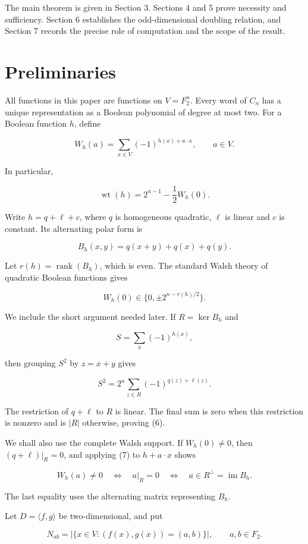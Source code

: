 \documentclass[11pt]{article}
\theoremstyle{remark}
\begin{document}
The main theorem is given in Section 3. Sections 4 and 5 prove necessity and sufficiency. Section 6 establishes the odd-dimensional doubling relation, and Section 7 records the precise role of computation and the scope of the result.

\section{Preliminaries}

All functions in this paper are functions on $V=F_2^n$. Every word of $C_n$ has a unique representation as a Boolean polynomial of degree at most two. For a Boolean function $h$, define

\[
W_h(a)=\sum_{x\in V}(-1)^{h(x)+a\cdot x},
\qquad a\in V.
\tag{3}
\]

In particular,

\[
\operatorname{wt}(h)=2^{n-1}-\frac12W_h(0).
\tag{4}
\]

Write $h=q+\ell+c$, where $q$ is homogeneous quadratic, $\ell$ is linear and $c$ is constant. Its alternating polar form is

\[
B_h(x,y)=q(x+y)+q(x)+q(y).
\tag{5}
\]

Let $r(h)=\operatorname{rank}(B_h)$, which is even. The standard Walsh theory of quadratic Boolean functions \cite{ref3} gives

\[
W_h(0)\in\{0,\pm2^{n-r(h)/2}\}.
\tag{6}
\]

We include the short argument needed later. If $R=\ker B_h$ and

\[
S=\sum_x(-1)^{h(x)},
\]

then grouping $S^2$ by $z=x+y$ gives

\[
S^2=2^n\sum_{z\in R}(-1)^{q(z)+\ell(z)}.
\tag{7}
\]

The restriction of $q+\ell$ to $R$ is linear. The final sum is zero when this restriction is nonzero and is $|R|$ otherwise, proving (6).

We shall also use the complete Walsh support. If $W_h(0) \ne 0$, then $(q+\ell)|_R=0$, and applying (7) to $h+a\cdot x$ shows

\[
W_h(a)\ne0
\quad\Longleftrightarrow\quad
a|_R=0
\quad\Longleftrightarrow\quad
a\in R^\perp=\operatorname{im}B_h.
\tag{8}
\]

The last equality uses the alternating matrix representing $B_h$.

Let $D=\langle f,g\rangle$ be two-dimensional, and put

\[
N_{ab}=|\{x\in V:(f(x),g(x))=(a,b)\}|,
\qquad a,b\in F_2.
\]
\end{document}
